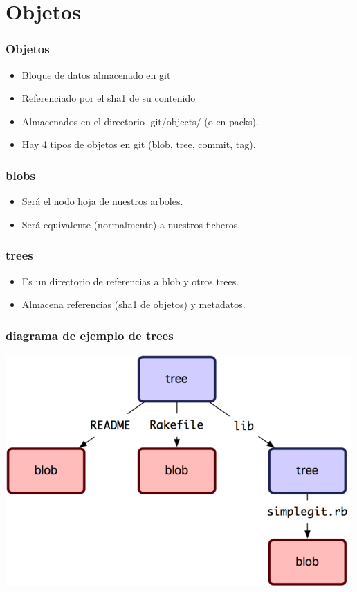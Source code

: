 \documentclass[10pt]{beamer}
\begin{document}
  \section*{Objetos}

  \begin{frame}
    \frametitle{Objetos}
    \begin{itemize}
        \item Bloque de datos almacenado en git
        \item Referenciado por el sha1 de su contenido
        \item Almacenados en el directorio .git/objects/ (o en packs).
        \item Hay 4 tipos de objetos en git (blob, tree, commit, tag).
    \end{itemize}
  \end{frame}

  \begin{frame}
    \frametitle{blobs}
    \begin{itemize}
        \item Será el nodo hoja de nuestros arboles.
        \item Será equivalente (normalmente) a nuestros ficheros.
    \end{itemize}
  \end{frame}

  \begin{frame}
    \frametitle{trees}
    \begin{itemize}
        \item Es un directorio de referencias a blob y otros trees.
        \item Almacena referencias (sha1 de objetos) y metadatos.
    \end{itemize}
  \end{frame}

  \begin{frame}
    \frametitle{diagrama de ejemplo de trees}
    \begin{center}\includegraphics{trees.png}\end{center}
  \end{frame}
\end{document}
